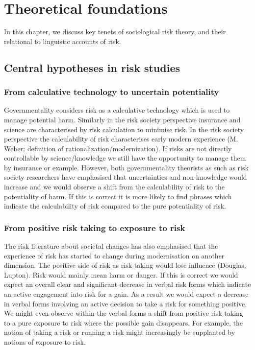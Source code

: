 
\chapter{Theoretical foundations}

In this chapter, we discuss key tenets of sociological risk theory, and their relational to linguistic accounts of risk.

\section{Central hypotheses in risk studies}

\subsection*{From calculative technology to uncertain potentiality}

Governmentality considers risk as a calculative technology which is used to manage potential harm. Similarly in the risk society perspective insurance and science are characterised by risk calculation to minimise risk. In the risk society perspective the calculability of risk characterises early modern experience (M. Weber: definition of rationalization\slash modernization). If risks are not directly controllable by science\slash knowledge we still have the opportunity to manage them by insurance or example. However, both governmentality theorists as such as risk society researchers have emphasised that uncertainties and non-knowledge would increase and we would observe a shift from the calculability of risk to the potentiality of harm. If this is correct it is more likely to find phrases which indicate the calculability of risk compared to the pure potentiality of risk. 

\subsection*{From positive risk taking to exposure to risk}

The risk literature about societal changes has also emphasised that the experience of risk has started to change during modernisation on another dimension. The positive side of risk as risk-taking would lose influence (Douglas, Lupton). Risk would mainly mean harm or danger. If this is correct we would expect an overall clear and significant decrease in verbal risk forms which indicate an active engagement into risk for a gain. As a result we would expect a decrease in verbal forms involving an active decision to take a risk for something positive. We might even observe within the verbal forms a shift from positive risk taking to a pure exposure to risk where the possible gain disappears. For example, the notion of taking a risk or running a risk might increasingly be supplanted by notions of exposure to risk.

